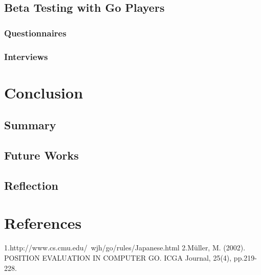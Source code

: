 \documentclass{l4proj}
\begin{document}
\section{Beta Testing with Go Players}
\subsection{Questionnaires}
\subsection{Interviews}






\chapter{Conclusion}

\section{Summary}

\section{Future Works}

\section{Reflection}


\chapter{References}
1.http://www.cs.cmu.edu/~wjh/go/rules/Japanese.html
2.Müller, M. (2002). POSITION EVALUATION IN COMPUTER GO. ICGA Journal, 25(4), pp.219-228.
\end{document}
